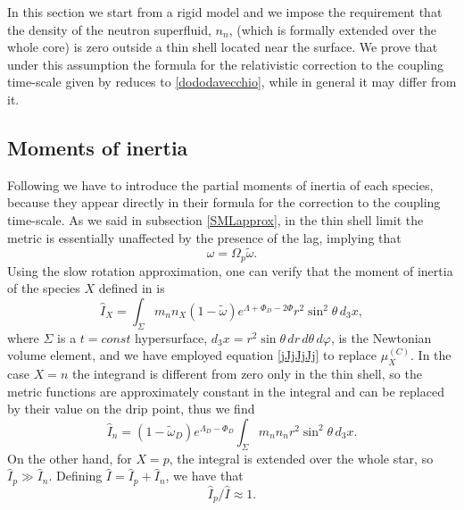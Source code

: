 \documentclass[usenatbib%
]{mnras}
\begin{document}
In this section we start from a rigid model and we impose the requirement that the density of the neutron superfluid, $n_n$, (which is formally extended over the whole core) is zero outside a thin shell located near the surface. We prove that under this assumption the formula for the relativistic correction to the coupling time-scale given by \cite{sourie_glitch2017}  reduces to \eqref{dododavecchio}, while in general it may differ from it.



\subsection{Moments of inertia}

Following \cite{sourie_glitch2017} we have to introduce the partial moments of inertia of each species, because they appear directly in their formula for the correction to the coupling time-scale. As we said in subsection \ref{SMLapprox}, in the thin shell limit the metric is essentially unaffected by the presence of the lag, implying that
\begin{equation}\label{approxxxXXxx}
\omega = \Omega_p \tilde{\omega}.
\end{equation}
Using the slow rotation approximation, one can verify that the moment of inertia of the species $X$ defined in \cite{sourie_glitch2017} is
\begin{equation}
\hat{I}_X = \int_\Sigma m_n n_X (1-\tilde{\omega})e^{\Lambda + \Phi_D - 2\Phi} r^2 \sin^2 \theta \, d_3 x, 
\end{equation}
where $\Sigma$ is a $t=const$ hypersurface, $d_3x =r^2 \sin \theta \, dr \, d\theta \, d \varphi$, is the Newtonian volume element, and we have employed equation \eqref{jJjJjJj} to replace $\mu_X^{(C)}$. 
In the case $X=n$ the integrand is different from zero only in the thin shell, so the metric functions are approximately constant in the integral and can be replaced by their value on the drip point, thus we find
\begin{equation}
\hat{I}_n =(1-\tilde{\omega}_D)e^{\Lambda_D-\Phi_D}\int_\Sigma m_n n_n  r^2 \sin^2 \theta \, d_3 x. 
\end{equation}
On the other hand, for $X=p$, the integral is extended over the whole star, so $\hat{I}_p \gg \hat{I}_n$. Defining $\hat{I}= \hat{I}_p+\hat{I}_n$, we have that
\begin{equation}\label{zucche}
\hat{I}_p/\hat{I} \approx 1.
\end{equation}
\end{document}
